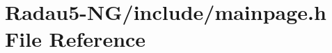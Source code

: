 \hypertarget{Radau5-NG_2include_2mainpage_8h}{\section{Radau5-\/\-N\-G/include/mainpage.h File Reference}
\label{Radau5-NG_2include_2mainpage_8h}
}
